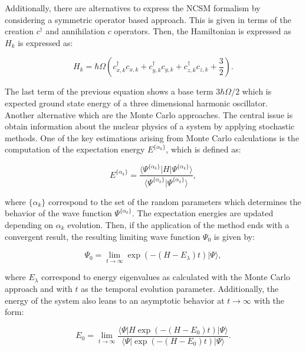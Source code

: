 \documentclass[openany]{book}
\begin{document}
Additionally, there are alternatives to express the NCSM formalism by considering a symmetric operator based approach. This is given in terms of the creation $c^{\dagger}$ and annihilation $c$ operators. Then, the Hamiltonian is expressed as $H_k$ is expressed as: 

\begin{equation}\label{eq:micro_NCSM_symmetric_Hamiltonian}
	H_k = \hbar \Omega \left (c^{\dagger}_{x, k} c_{x, k} + c^{\dagger}_{y, k} c_{y, k} +  c^{\dagger}_{z, k} c_{z, k} +  \frac{3}{2}  \right).
\end{equation}

The last term of the previous equation shows a base term  $3\hbar\Omega/2$ which is expected ground state energy of a three dimensional harmonic oscillator. \\

Another alternative which are the Monte Carlo approaches. The central issue is obtain information about the nuclear physics of a system by applying stochastic methods. One of the key estimations arising from Monte Carlo calculations is the computation of the expectation energy $E^{\{\alpha_k\}}$, which is defined as: 
	
\begin{equation}\label{eq:micro_monteCarlo_variational_energy_expectation}
	E^{\{\alpha_k\}} =  \frac{\langle \Psi^{\{\alpha_k\}} | H |  \Psi^{\{\alpha_k\}} \rangle}{ \langle \Psi^{\{\alpha_k\}} |  \Psi^{\{\alpha_k\}} \rangle},
\end{equation}

where $\{\alpha_k\}$ correspond to the set of the random parameters which determines the behavior of the wave function
 $\Psi^{\{\alpha_k\}}$. The expectation energies are updated depending on $\alpha_k$ evolution. Then, if the application of the method ends with a convergent result, the resulting limiting wave function $\Psi_0$ is given by:

\begin{equation}\label{eq:micro_monteCarlo_variational_waveFucntion_limit}
	\Psi_0 = \lim_{t \rightarrow \infty } \exp {(-(H - E_\lambda)t)} |\Psi \rangle,
\end{equation}

where $E_\lambda$ correspond to energy eigenvalues as calculated with the Monte Carlo approach and with $t$ as the temporal evolution parameter. Additionally, the energy of the system also leans to an asymptotic behavior at $t \rightarrow \infty$ with the form:

\begin{equation}\label{eq:micro_monteCarlo_variational_energy_limit}
	E_0 = \lim_{t \rightarrow \infty } {\frac{\langle \Psi | H \exp (-(H - E_0)t) | \Psi \rangle }{\langle \Psi | \exp (-(H - E_0)t) | \Psi \rangle}}.
\end{equation}
\end{document}
